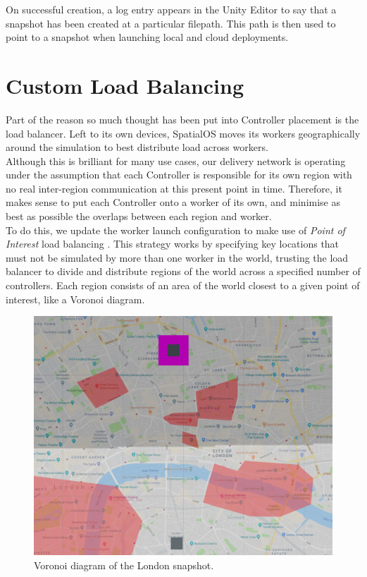 \documentclass[a4paper,11pt,titlepage]{report}
\begin{document}
On successful creation, a log entry appears in the Unity Editor to say that a snapshot has been created at a particular filepath. This path is then used to point to a snapshot when launching local and cloud deployments.

\section{Custom Load Balancing}
Part of the reason so much thought has been put into Controller placement is the load balancer. Left to its own devices, SpatialOS moves its workers geographically around the simulation to best distribute load across workers.\\

Although this is brilliant for many use cases, our delivery network is operating under the assumption that each Controller is responsible for its own region with no real inter-region communication at this present point in time. Therefore, it makes sense to put each Controller onto a worker of its own, and minimise as best as possible the overlaps between each region and worker.\\

To do this, we update the worker launch configuration to make use of \textit{Point of Interest} load balancing \cite{ImprobableWorldsLtd.2018d}. This strategy works by specifying key locations that must not be simulated by more than one worker in the world, trusting the load balancer to divide and distribute regions of the world across a specified number of controllers. Each region consists of an area of the world closest to a given point of interest, like a Voronoi diagram.

\begin{figure}[!hbpt]
  \center
  \includegraphics[width=0.8\linewidth]{img/smol.png}
  \caption{Voronoi diagram of the London snapshot.}
  \label{fig:smol}
\end{figure}
\end{document}
